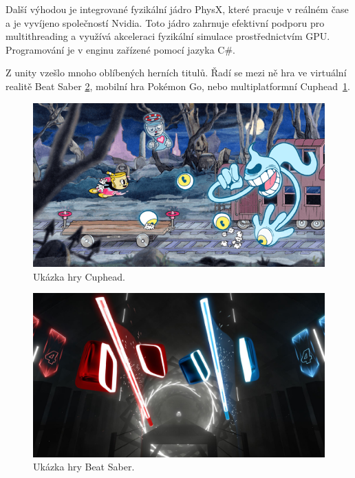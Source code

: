 Další výhodou je integrované fyzikální jádro PhysX, které pracuje v reálném čase a je vyvíjeno společností Nvidia. Toto jádro zahrnuje efektivní podporu pro multithreading a využívá akceleraci fyzikální simulace prostřednictvím GPU. Programování je v enginu zařízené pomocí jazyka C\#.

Z unity vzešlo mnoho oblíbených herních titulů. Řadí se mezi ně hra ve virtuální realitě Beat Saber \ref{fig:beatSaber}, mobilní hra Pokémon Go, nebo multiplatformní Cuphead~\ref{fig:cuphead}.
\begin{figure}[H]
	\centering
	\includegraphics[scale=0.61]{obrazky-figures/Cuphead.png}
	\caption{Ukázka hry Cuphead.}
	\label{fig:cuphead}
\end{figure}
\begin{figure}[H]
	\centering
	\includegraphics[scale=0.15]{obrazky-figures/BeatSaber.jpg}
	\caption{Ukázka hry Beat Saber.}
	\label{fig:beatSaber}
\end{figure}

\newpage

